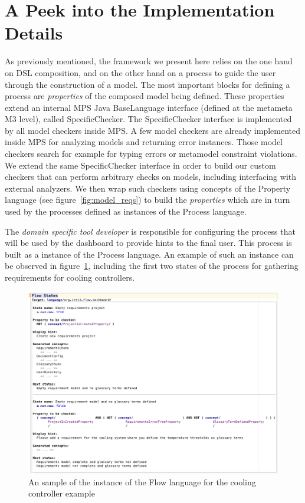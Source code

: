 \section{A Peek into the Implementation Details}
\label{sec:implementation}

As previously mentioned, the framework we present here relies on the one hand on
DSL composition, and on the other hand on a process to guide the user through
the construction of a model. The most important blocks for defining a
process are \emph{properties} of the composed model being defined. These
properties extend an internal MPS Java \textsf{BaseLanguage} interface (defined
at the metameta M3 level), called \textsf{SpecificChecker}.
The  \textsf{SpecificChecker} interface is implemented by all model checkers
inside MPS. A few model checkers are already implemented inside MPS for
analyzing models and returning error instances. Those model checkers
search for example for typing errors or metamodel constraint violations. We
extend the same \textsf{SpecificChecker} interface in order to build our custom checkers that
can perform arbitrary checks on models, including interfacing with external
analyzers. We then wrap such checkers using concepts of the \textsf{Property}
language (see figure~\ref{fig:model_reqs}) to build the \emph{properties} which
are in turn used by the processes defined as instances of the \textsf{Process}
language.

The \emph{domain specific tool developer} is responsible for configuring the
process that will be used by the dashboard to provide hints to the final user.
This process is built as a instance of the \textsf{Process} language. An example
of such an instance can be observed in figure~\ref{fig:flow_model}, including the
first two states of the process for gathering requirements for cooling
controllers.

\begin{figure}[!h]
\centering 
\includegraphics[width=1.55\columnwidth]{./figures/FlowModel.png}
\caption{An sample of the instance of the Flow language for the cooling
controller example}
\label{fig:flow_model}
\end{figure}


